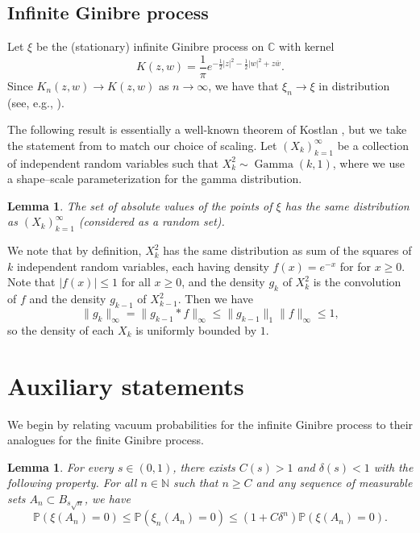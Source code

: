 \documentclass{amsart}
\theoremstyle{plain}
\newtheorem{lemma}[theorem]{Lemma}
\theoremstyle{definition}
\theoremstyle{remark}
\begin{document}
\subsection{Infinite Ginibre process} 
Let $\xi$ be the (stationary) infinite Ginibre process on $\mathbb C$ with kernel \[K(z,w)=\frac {1}{\pi} 
e^{ - \frac{1}{2} |z|^2  - \frac{1}{2} |w|^2  + z \bar w }.\] 
Since $K_n(z,w) \to K(z,w)$ as $n \to \infty$, we have that $\xi_n \to \xi$ in distribution (see, e.g., \cite[Theorem 11.1.VII]{daley}). 

The following result is essentially a well-known theorem of Kostlan \cite[Theorem 1.1]{K92}, but we take the statement from \cite[Theorem 4.3.10]{BKPV09} to match our choice of scaling.  Let $( X_k)_{k=1}^{\infty}$ be a collection of independent random variables such that $X^2_k\sim \operatorname{Gamma}(k,1)$, where we use a shape--scale parameterization for the gamma distribution.

\begin{lemma}\label{l:gincounting}
The set of absolute values of the points of $\xi$ has the same distribution as $( X_k)_{k=1}^{\infty}$ (considered as a random set).
\end{lemma}

We note that by definition, $X^2_{k}$ has the same distribution as sum of the squares of $k$ independent  random variables, each having density $f(x) = e^{-x}$ for for $x\ge 0$. Note that  $|f(x)|\le 1$ for all $x \ge 0$, and the density $g_{k}$ of $X^2_{k}$ is the convolution of $f$ and the density $g_{k-1}$ of $X^2_{k-1}$. Then we have
\begin{equation}\label{e:gammadensitybound}
\| g_k \|_\infty = \| g_{k-1} \ast  f \|_\infty \le \| g_{k-1} \|_1 \| f \|_\infty \le 1,
\end{equation}
so the density of each $X_{k}$ is uniformly bounded by $1$.
 
\section{Auxiliary statements}

We begin by relating vacuum probabilities for the infinite Ginibre process to their analogues for the finite Ginibre process. 

\begin{lemma} \label{lem:gininf}
	For every $s \in (0,1)$, there exists $C(s)>1$ and  $\delta(s) <1$ with the following property.  For all $n  \in \mathbb N$ such that $n \ge C$ and any sequence of measurable sets $A_n \subset B_{s \sqrt n}$, we have 
	$$
	\mathbb P(\xi(A_n)=0) \le  \mathbb P(\xi_n(A_n)=0) \le (1+C \delta^n) \mathbb P(\xi(A_n)=0).
	$$
\end{lemma}
\end{document}
